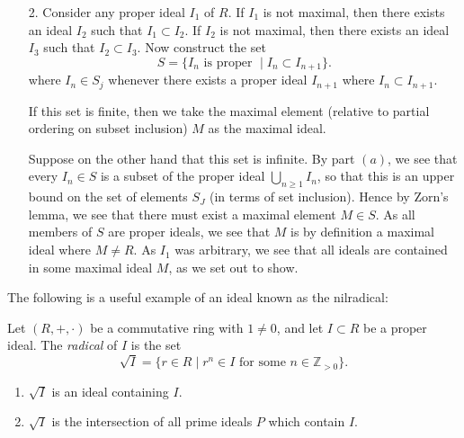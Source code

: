 \documentclass[12pt,letterpaper]{algebra_book}
\newcommand{\zz}{\mathbb{Z}}
\theoremstyle{definition}
\begin{document}
\begin{prf}
\begin{itemize}
            \item[2.] Consider any proper ideal $I_1$ of $R$. If $I_1$ is not maximal,
            then there exists an ideal $I_2$ such that $I_1 \subset I_2$. If
            $I_2$ is not maximal, then there exists an ideal $I_3$ such
            that $I_2 \subset I_3$.
            Now construct the set 
            \[
                S = \{I_n \text{ is proper } \mid I_{n} \subset I_{n+1}\}.
            \]
            where $I_n \in S_j$ whenever there exists a proper ideal
            $I_{n+1}$ where $I_n \subset I_{n+1}$.
            
            If this set is finite, then we take the maximal element
            (relative to partial ordering on subset inclusion) $M$ as the
            maximal ideal. 
    
            Suppose on the other hand that this set is infinite. 
            By part
            $(a)$, we see that every $I_n \in S$ is a subset of the proper
            ideal $\bigcup_{n \ge 1} I_n$, so that this is an upper bound
            on the set of elements $S_J$ (in terms of set inclusion).
            Hence by Zorn's lemma, we see that there must exist a maximal
            element $M \in S$. As all members of $S$ are proper ideals, we
            see that $M$ is by definition a maximal ideal where $M \ne R$.
            As $I_1$ was arbitrary, we see that all ideals are contained in
            some maximal ideal $M$, as we set out to show.
        \end{itemize}
    \end{prf}

    The following is a useful example of an ideal known as the
    nilradical:
    \begin{proposition}
        Let $(R, +, \cdot)$ be a commutative ring with $1 \ne 0$, and let
    $I \subset R$ be a proper ideal. The 
    \textit{radical} of $I$ is the set 
    \[
        \sqrt{I} = \{r \in R \mid r^n \in I \text{ for some } n \in \zz_{> 0}  \}.
    \]
    \begin{enumerate}
        \item $\sqrt{I}$ is an ideal containing $I$. 
        
        \item $\sqrt{I}$ is the intersection of all prime
        ideals $P$ which contain $I$.
    \end{enumerate}
    \end{proposition}
\end{document}
